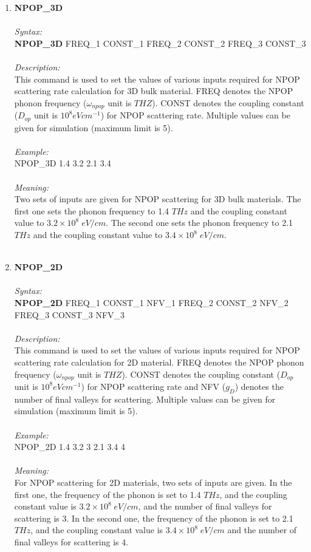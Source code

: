 \documentclass[12pt]{article}
\begin{document}
\begin{enumerate}
    \item \textbf{NPOP\_3D}   \\ \\
    \textit{Syntax:} \\
    \textbf{NPOP\_3D} FREQ\_1 CONST\_1 FREQ\_2 CONST\_2 FREQ\_3 CONST\_3 \\ \\
    \textit{Description:} \\
    This command is used to set the values of various inputs required for NPOP scattering rate calculation for 3D bulk material. FREQ denotes the NPOP phonon frequency ($\omega_{npop}$ unit is $THZ$). CONST denotes the coupling constant ($D_{op}$ unit is $10^8 eV cm^{-1}$) for NPOP scattering rate. Multiple values can be given for simulation (maximum limit is 5). \\ \\
    \textit{Example:} \\
    NPOP\_3D 1.4 3.2 2.1 3.4 \\ \\
    \textit{Meaning:} \\   
    Two sets of inputs are given for NPOP scattering for 3D bulk materials. The first one sets the phonon frequency to 1.4 $THz$ and the coupling constant value to $3.2 \times 10^{8} \; eV/cm$. The second one sets the phonon frequency to 2.1 $THz$ and the coupling constant value to $3.4 \times 10^{8} \; eV/cm$. \\ \\     
    \item \textbf{NPOP\_2D}   \\ \\
    \textit{Syntax:} \\
    \textbf{NPOP\_2D} FREQ\_1 CONST\_1 NFV\_1 FREQ\_2 CONST\_2 NFV\_2 FREQ\_3 CONST\_3 NFV\_3 \\ \\
    \textit{Description:} \\
    This command is used to set the values of various inputs required for NPOP scattering rate calculation for 2D material. FREQ denotes the NPOP phonon frequency ($\omega_{npop}$ unit is $THZ$). CONST denotes the coupling constant ($D_{op}$ unit is $10^8 eV cm^{-1}$) for NPOP scattering rate and NFV ($g_D$) denotes the number of final valleys for scattering. Multiple values can be given for simulation (maximum limit is 5). \\ \\
    \textit{Example:} \\
    NPOP\_2D 1.4 3.2 3 2.1 3.4 4  \\ \\
    \textit{Meaning:} \\  
    For NPOP scattering for 2D materials, two sets of inputs are given. In the first one, the frequency of the phonon is set to 1.4 $THz$, and the coupling constant value is $3.2 \times 10^{8} \; eV/cm$, and the number of final valleys for scattering is 3. In the second one, the frequency of the phonon is set to 2.1 $THz$, and the coupling constant value is $3.4 \times 10^{8} \; eV/cm$ and the number of final valleys for scattering is 4.    \\ \\
    

\end{enumerate}
\end{document}
